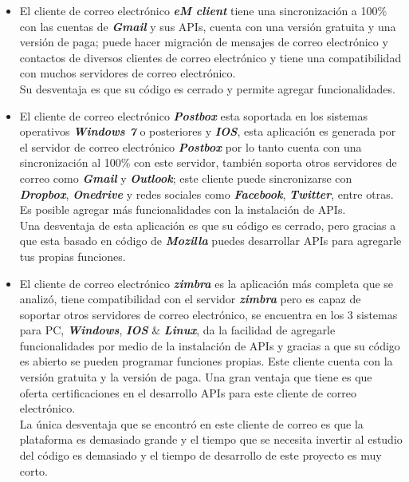 \documentclass[12pt,oneside,onecolumn,openany]{report}
\begin{document}
\begin{itemize}
 \item El cliente de correo electrónico \textbf{\textit{eM client}} tiene una sincronización a 100\% con las cuentas de \textbf{\textit{Gmail}} y sus APIs, cuenta con una versión gratuita y una versión de paga; puede hacer migración de mensajes de correo electrónico y contactos de diversos clientes de correo electrónico y tiene una compatibilidad con muchos servidores de correo electrónico.\cite{em}\\Su desventaja es que su código es cerrado y permite agregar funcionalidades.
 \item El cliente de correo electrónico \textbf{\textit{Postbox}} esta soportada en los sistemas operativos \textbf{\textit{Windows 7}} o posteriores y \textbf{\textit{IOS}}, esta aplicación es generada por el servidor de correo electrónico \textbf{\textit{Postbox}} por lo tanto cuenta con una sincronización al 100\% con este servidor, también soporta otros servidores de correo como \textbf{\textit{Gmail}} y \textbf{\textit{Outlook}}; este cliente puede sincronizarse con \textbf{\textit{Dropbox}}, \textbf{\textit{Onedrive}} y redes sociales como \textbf{\textit{Facebook}}, \textbf{\textit{Twitter}}, entre otras. Es posible agregar más funcionalidades con la instalación de APIs.\\Una desventaja de esta aplicación es que su código es cerrado, pero gracias a que esta basado en código de \textbf{\textit{Mozilla}} puedes desarrollar APIs para agregarle tus propias funciones. \cite{box}
 \item El cliente de correo electrónico \textbf{\textit{zimbra}} es la aplicación más completa que se analizó, tiene compatibilidad con el servidor \textbf{\textit{zimbra}} pero es capaz de soportar otros servidores de correo electrónico, se encuentra en los 3 sistemas para PC, \textbf{\textit{Windows}}, \textbf{\textit{IOS}} \& \textbf{\textit{Linux}}, da la facilidad de agregarle funcionalidades por medio de la instalación de APIs y gracias a que su código es abierto se pueden programar funciones propias. Este cliente cuenta con la versión gratuita y la versión de paga. Una gran ventaja que tiene es que oferta certificaciones en el desarrollo APIs para este cliente de correo electrónico.\cite{zim}\\La única desventaja que se encontró en este cliente de correo es que la plataforma es demasiado grande y el tiempo que se necesita invertir al estudio del código es demasiado y el tiempo de desarrollo de este proyecto es muy corto.

\end{itemize}
\end{document}
